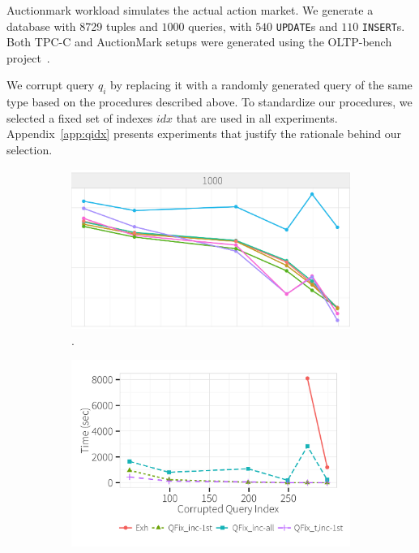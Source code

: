  Auctionmark workload simulates the 
actual action market. We generate a database 
with 8729 tuples and $1000$ queries, with $540$ \texttt{UPDATE}s and $110$ \texttt{INSERT}s.
Both TPC-C and AuctionMark setups were generated using the OLTP-bench project~\cite{oltpbench,oltpbenchgit}.


 We corrupt query $q_i$ by replacing it with a randomly
generated query of the same type based on the procedures described above.
To standardize our procedures, we selected a fixed set of indexes $idx$
that are used in all experiments.  Appendix~\ref{app:qidx} presents
experiments that justify the rationale behind our selection.

  \begin{figure}[h]
  \centering
    \vspace*{-.2in}
    \begin{subfigure}[t]{.3\textwidth}
    \includegraphics[width = .99\columnwidth]{figures/scale_allalgs}
    \vspace*{-.1in}
    \caption{.}
    \label{f:multiquery} 
    \end{subfigure}
    \begin{subfigure}[t]{.3\textwidth}
    \includegraphics[width = .99\columnwidth]{figures/incrementalcompare_time}

\end{subfigure}
\end{figure}
